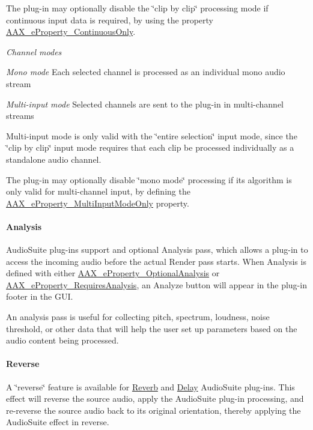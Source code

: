 The plug-\/in may optionally disable the \char`\"{}clip by clip\char`\"{} processing mode if continuous input data is required, by using the property \hyperlink{a00283_a6571f4e41a5dd06e4067249228e2249ea95054276be8782d93437cd74669366d0}{A\+A\+X\+\_\+e\+Property\+\_\+\+Continuous\+Only}.

{\itshape Channel modes } 
\begin{DoxyItemize}
\item {\itshape  Mono mode} Each selected channel is processed as an individual mono audio stream  
\item {\itshape  Multi-\/input mode} Selected channels are sent to the plug-\/in in multi-\/channel streams  
\end{DoxyItemize}

Multi-\/input mode is only valid with the \char`\"{}entire selection\char`\"{} input mode, since the \char`\"{}clip by clip\char`\"{} input mode requires that each clip be processed individually as a standalone audio channel.

The plug-\/in may optionally disable \char`\"{}mono mode\char`\"{} processing if its algorithm is only valid for multi-\/channel input, by defining the \hyperlink{a00283_a6571f4e41a5dd06e4067249228e2249eaa15cf3edd899af4a98fa18fcdfdeb9d6}{A\+A\+X\+\_\+e\+Property\+\_\+\+Multi\+Input\+Mode\+Only} property.

\hypertarget{a00360_subsubsection__analysis_}{}\paragraph{Analysis}\label{a00360_subsubsection__analysis_}
 Audio\+Suite plug-\/ins support and optional Analysis pass, which allows a plug-\/in to access the incoming audio before the actual Render pass starts. When Analysis is defined with either \hyperlink{a00283_a6571f4e41a5dd06e4067249228e2249ea5a2bacb421fc36f890a121f01a9e72ba}{A\+A\+X\+\_\+e\+Property\+\_\+\+Optional\+Analysis} or \hyperlink{a00283_a6571f4e41a5dd06e4067249228e2249ea925c49bb79454b33bf1d5f4cb09d373f}{A\+A\+X\+\_\+e\+Property\+\_\+\+Requires\+Analysis}, an Analyze button will appear in the plug-\/in footer in the G\+U\+I.

An analysis pass is useful for collecting pitch, spectrum, loudness, noise threshold, or other data that will help the user set up parameters based on the audio content being processed.

\hypertarget{a00360_subsubsection__reverse_}{}\paragraph{Reverse}\label{a00360_subsubsection__reverse_}
 A \char`\"{}reverse\char`\"{} feature is available for \hyperlink{a00206_aef9637518fb1ac0e2f403444c73aba4aa3a6bc05ef91a38b7c496236b8a28ab6d}{Reverb} and \hyperlink{a00206_aef9637518fb1ac0e2f403444c73aba4aa30cbbd310bb38aad2326dc183f9ca27b}{Delay} Audio\+Suite plug-\/ins. This effect will reverse the source audio, apply the Audio\+Suite plug-\/in processing, and re-\/reverse the source audio back to its original orientation, thereby applying the Audio\+Suite effect in reverse.

